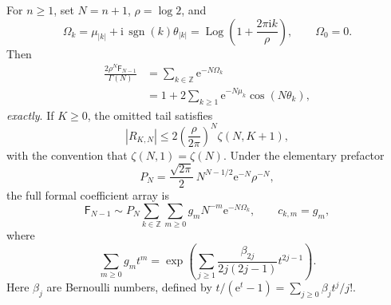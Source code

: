 \documentclass[11pt,oneside]{article}
\numberwithin{equation}{section}
\newcommand{\e}{\mathrm e}
\newcommand{\ii}{\mathrm i}
\newcommand{\Z}{\mathbb Z}
\newcommand{\Fub}{\mathsf F}
\newcommand{\Log}{\operatorname{Log}}
\newcommand{\StirlingTwo}[2]{\left\{\!\begin{matrix}#1\\#2\end{matrix}\!\right\}}
\newcommand{\abs}[1]{\left|#1\right|}
\newcommand{\paren}[1]{\left(#1\right)}
\begin{document}
\begin{abstract}
Let \(\Fub_n=\sum_{j=0}^n j!\StirlingTwo{n}{j}\) be the \(n\)-th Fubini number, and put \(\rho=\log 2\), \(N=n+1\), and \(\rho_k=\rho+2\pi\ii k\).  We prove the exact identity
\[
 \Fub_n=\frac{\Gamma(N)}{2}\sum_{k\in\Z}\rho_k^{-N}
       =\frac{\Gamma(N)}{2\rho^N}\sum_{k\in\Z}\e^{-N\Omega_k},
 \qquad
 \Omega_k=\Log\!\paren{1+\frac{2\pi\ii k}{\rho}},
\]
valid for every integer \(n\ge1\).  The sum converges absolutely and is not merely asymptotic.  Pairing conjugate poles gives the exact real oscillatory transseries
\[
 \Fub_n=\frac{n!}{2\rho^{n+1}}
 \left[1+2\sum_{k\ge1}\e^{-(n+1)\mu_k}
 \cos\!\bigl((n+1)\theta_k\bigr)\right],
\]
where \(\mu_k=\tfrac12\log(1+(2\pi k/\rho)^2)\) and
\(\theta_k=\arctan(2\pi k/\rho)\).  We give a sharp sector ordering and explicit Hurwitz-zeta and first-omitted-scale bounds for every finite pole truncation.

After replacing \(\Gamma(N)\) by its Stirling expansion, the complete two-index coefficient array factorizes: the coefficient in every pole sector is the same Stirling coefficient \(g_m\).  These coefficients are determined equivalently by a Bernoulli-number generating function, a partition sum over odd parts, a complete exponential Bell polynomial, and a triangular recurrence.  In the exact-factorial normalization the stronger statement holds: each pole sector has coefficient \(1\) at algebraic order zero and all higher algebraic coefficients vanish.  Finally, a countable-variable multinomial theorem gives general coefficients for analytic functions of the normalized transseries, including explicit multi-sector formulae for \(\log \Fub_n\), arbitrary powers, reciprocals, and shifted ratios.  The entire construction extends verbatim to Fubini polynomials and geometric moments.
\end{abstract}

\begin{mainbox}
For \(n\ge1\), set \(N=n+1\), \(\rho=\log2\), and
\[
 \Omega_k=\mu_{|k|}+\ii\,\operatorname{sgn}(k)\theta_{|k|}
 =\Log\!\paren{1+\frac{2\pi\ii k}{\rho}},\qquad \Omega_0=0.
\]
Then
\begin{align*}
 \frac{2\rho^N\Fub_{N-1}}{\Gamma(N)}
 &=\sum_{k\in\Z}\e^{-N\Omega_k}\\
 &=1+2\sum_{k\ge1}\e^{-N\mu_k}\cos(N\theta_k),
\end{align*}
\emph{exactly}.  If \(K\ge0\), the omitted tail satisfies
\[
 \abs{R_{K,N}}
 \le 2\paren{\frac{\rho}{2\pi}}^N\zeta(N,K+1),
\]
with the convention that \(\zeta(N,1)=\zeta(N)\).  Under the elementary prefactor
\[
 P_N=\frac{\sqrt{2\pi}}{2}\,N^{N-1/2}\e^{-N}\rho^{-N},
\]
the full formal coefficient array is
\[
 \Fub_{N-1}\sim P_N
 \sum_{k\in\Z}\sum_{m\ge0}g_mN^{-m}\e^{-N\Omega_k},
 \qquad c_{k,m}=g_m,
\]
where
\[
 \sum_{m\ge0}g_mt^m
 =\exp\!\left(\sum_{j\ge1}\frac{\beta_{2j}}{2j(2j-1)}t^{2j-1}\right).
\]
Here \(\beta_j\) are Bernoulli numbers, defined by
\(t/(\e^t-1)=\sum_{j\ge0}\beta_jt^j/j!\).
\end{mainbox}
\end{document}
